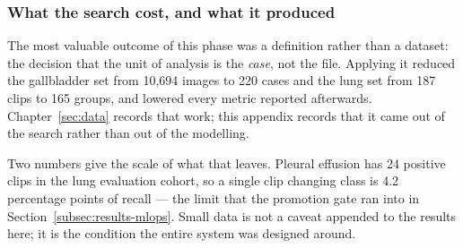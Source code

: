 \subsubsection{What the search cost, and what it produced}

The most valuable outcome of this phase was a definition rather than a dataset: the decision
that the unit of analysis is the \emph{case}, not the file. Applying it reduced the gallbladder
set from 10{,}694 images to 220 cases and the lung set from 187 clips to 165 groups, and
lowered every metric reported afterwards. Chapter~\ref{sec:data} records that work; this
appendix records that it came out of the search rather than out of the modelling.

Two numbers give the scale of what that leaves. Pleural effusion has 24 positive clips in the
lung evaluation cohort, so a single clip changing class is 4.2 percentage points of recall ---
the limit that the promotion gate ran into in Section~\ref{subsec:results-mlops}. Small data
is not a caveat appended to the results here; it is the condition the entire system was
designed around.
